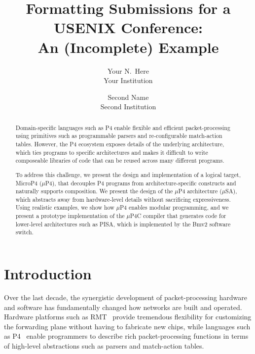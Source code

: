 \date{}

\title{\Large \bf Formatting Submissions for a USENIX Conference:\\
  An (Incomplete) Example}

\author{
{\rm Your N.\ Here}\\
Your Institution
\and
{\rm Second Name}\\
Second Institution
} %

\maketitle

\begin{abstract}
Domain-specific languages such as P4 enable flexible and efficient
packet-processing using primitives such as programmable parsers and
re-configurable match-action tables. However, the P4 ecosystem exposes
details of the underlying architecture, which ties programs to
specific architectures and makes it difficult to write composeable
libraries of code that can be reused across many different programs.

To address this challenge, we present the design and implementation of
a logical target, MicroP4 ($\mu$P4), that decouples P4 programs from
architecture-specific constructs and naturally supports composition.
We present the design of the $\mu$P4 architecture ($\mu$SA), which
abstracts away from hardware-level details without sacrificing
expressiveness. Using realistic examples, we show how $\mu$P4 enables
modular programming, and we present a prototype implementation of the
$\mu$P4C compiler that generates code for lower-level architectures
such as PISA, which is implemented by the Bmv2 software switch.
\end{abstract}


\section{Introduction}

Over the last decade, the synergistic development of packet-processing
hardware and software has fundamentally changed how networks are built
and operated. Hardware platforms such as
RMT~\cite{Bosshart:2013:FMF:2486001.2486011} provide tremendous
flexibility for customizing the forwarding plane without having to
fabricate new chips, while languages such as
P4~\cite{Bosshart:2014:PPP:2656877.2656890, p4lang} enable programmers
to describe rich packet-processing functions in terms of high-level
abstractions such as parsers and match-action tables.

